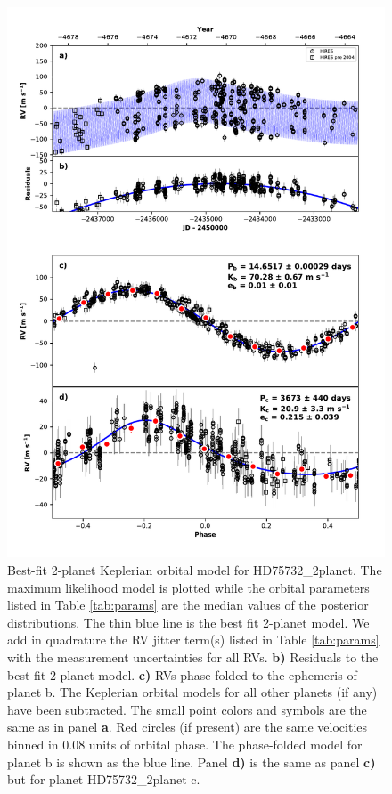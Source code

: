 \documentclass{emulateapj}
\begin{document}
\begin{figure}[!h]
\centering
\includegraphics[width=6.5in]{HD75732_2planet_rv_multipanel.pdf}
\caption{
Best-fit 2-planet Keplerian orbital model for HD75732\_2planet.
The maximum likelihood model is plotted while the orbital parameters listed in Table \ref{tab:params}
are the median values of the posterior distributions.
The thin blue line is the best fit 2-planet model. We add in quadrature the RV jitter term(s) listed in Table \ref{tab:params}
with the measurement uncertainties for all RVs.
{\bf b)} Residuals to the best fit 2-planet model.
{\bf c)} RVs phase-folded to the ephemeris of planet b. The Keplerian orbital models for all other planets (if any) have been subtracted.
The small point colors and symbols are the same as in panel {\bf a}.
Red circles (if present) are the same velocities binned in 0.08 units of orbital phase.
The phase-folded model for planet b is shown as the blue line.
Panel {\bf d)} is the same as panel {\bf c)} but for planet HD75732\_2planet c.
}
\end{figure}
\end{document}
